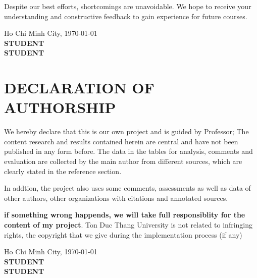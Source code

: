 \documentclass[a4paper, 14pt]{extarticle}
\newcommand{\advisor}{Professor}
\newcommand{\authorone}{STUDENT}
\newcommand{\authortwo}{STUDENT}
\begin{document}
Despite our best efforts, shortcomings are unavoidable. We hope to receive your understanding and constructive feedback to gain experience for future courses.

\vspace{1.5cm}
\begin{flushright}
	Ho Chi Minh City, \today \\[2cm]
	\textbf{\authorone} \\[2cm]
	\textbf{\authortwo}
\end{flushright}

\newpage
{}
\setcounter{page}{3}

\section*{\centering DECLARATION OF AUTHORSHIP}

We hereby declare that this is our own project and is guided by \advisor; The content research and results contained herein are central and have not been published in any form before. The data in the tables for analysis, comments and evaluation are collected by the main author from different sources, which are clearly stated in the reference section.

In addtion, the project also uses some comments, assessments as well as data of other authors, other organizations with citations and annotated sources.

\textbf{if something wrong happends, we will take full responsiblity for the content of my project}. Ton Duc Thang University is not related to infringing rights, the copyright that we give during the implementation process (if any)

\vspace{1.5cm}
\begin{flushright}
	Ho Chi Minh City, \today \\[2cm]
	\textbf{\authorone} \\[2cm]
	\textbf{\authortwo}
\end{flushright}

\newpage
{}
\setcounter{page}{4}
\renewcommand*\contentsname{\centering TABLE OF CONTENTS}
\tableofcontents
\newpage

\newpage
{}
{}
\printbibliography[title={References}]
\end{document}
